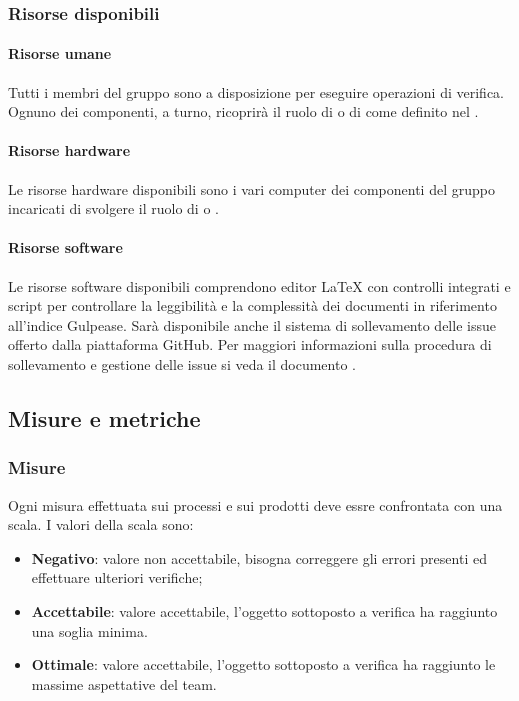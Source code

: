 \documentclass[PianoDiQualifica.tex]{subfiles}
\begin{document}
		\subsubsection{Risorse disponibili}
		
			\paragraph{Risorse umane}
			Tutti i membri del gruppo sono a disposizione per eseguire operazioni di verifica. Ognuno dei componenti, a turno, ricoprirà il ruolo di \RESP{} o di \VER{} come definito nel \PPdocRR{}.
			
			\paragraph{Risorse hardware}
			Le risorse hardware disponibili sono i vari computer dei componenti del gruppo incaricati di svolgere il ruolo di \RESP{} o \VER{}.
			
			\paragraph{Risorse software}
			Le risorse software disponibili comprendono editor \LaTeX{} con controlli integrati e script per controllare la leggibilità e la complessità dei documenti in riferimento all’indice Gulpease.
			Sarà disponibile anche il sistema di sollevamento delle issue offerto dalla piattaforma GitHub. Per maggiori informazioni sulla procedura di sollevamento e gestione delle issue si veda
			il documento \NPdocRR{}.
			
	\subsection{Misure e metriche}
	
		\subsubsection{Misure}
		Ogni misura effettuata sui processi e sui prodotti deve essre confrontata con una scala. I valori della scala sono:
		\begin{itemize}
			\item \textbf{Negativo}: valore non accettabile, bisogna correggere gli errori presenti ed effettuare ulteriori verifiche;
			\item \textbf{Accettabile}: valore accettabile, l’oggetto sottoposto a verifica ha raggiunto una soglia minima.
			\item \textbf{Ottimale}: valore accettabile, l’oggetto sottoposto a verifica ha raggiunto le massime aspettative del team.
		\end{itemize}
		
\end{document}

